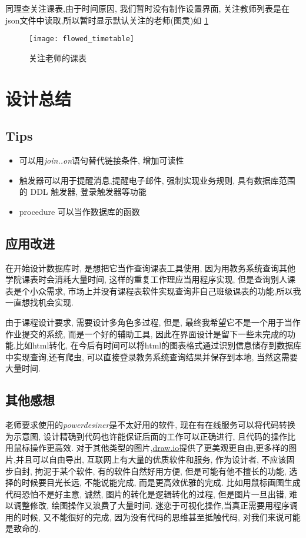 \documentclass{myreport}
\begin{document}
    同理查关注课表,由于时间原因,
    我们暂时没有制作设置界面, 关注教师列表是在json文件中读取,所以暂时显示默认关注的老师(图灵)如
    \cref{fig:flowed_timetable}
    \begin{figure}[H]
      \centering
      \texttt{[image: flowed\_timetable]}
      \caption{关注老师的课表}
      \label{fig:flowed_timetable}
    \end{figure}


\section{设计总结}
  \subsection{Tips}
    \begin{itemize}
      \item 可以用\emph{join..on}语句替代链接条件, 增加可读性
      \item 触发器可以用于提醒消息,提醒电子邮件,
        强制实现业务规则,
        具有数据库范围的 DDL 触发器,
        登录触发器等功能
      \item procedure 可以当作数据库的函数
    \end{itemize}
  \subsection{应用改进}
    在开始设计数据库时, 是想把它当作查询课表工具使用,
    因为用教务系统查询其他学院课表时会消耗大量时间,
    这样的重复工作理应当用程序实现,
    但是查询别人课表是个小众需求, 市场上并没有课程表软件实现查询非自己班级课表的功能,所以我一直想找机会实现.

    由于课程设计要求, 需要设计多角色多过程,
    但是, 最终我希望它不是一个用于当作作业提交的系统,
    而是一个好的辅助工具, 因此在界面设计是留下一些未完成的功能,比如html转化, 在今后有时间可以将html的图表格式通过识别信息储存到数据库中实现查询,还有爬虫, 可以直接登录教务系统查询结果并保存到本地, 当然这需要大量时间.
  \subsection{其他感想}

    老师要求使用的\emph{powerdesiner}是不太好用的软件,
    现在有在线服务可以将代码转换为示意图,
    设计精确到代码也许能保证后面的工作可以正确进行,
    且代码的操作比用鼠标操作更高效.
    对于其他类型的图片,\url{draw.io}提供了更美观更自由,更多样的图片,并且可以自由导出,
    互联网上有大量的优质软件和服务,
    作为设计者, 不应该固步自封, 拘泥于某个软件,
    有的软件自然好用方便, 但是可能有他不擅长的功能,
    选择的时候要目光长远, 不能说能完成,
    而是更高效优雅的完成.
    比如用鼠标画图生成代码恐怕不是好主意,
    诚然, 图片的转化是逻辑转化的过程,
    但是图片一旦出错, 难以调整修改,
    绘图操作又浪费了大量时间.
    迷恋于可视化操作,当真正需要用程序调用的时候,
    又不能很好的完成,
    因为没有代码的思维甚至抵触代码,
    对我们来说可能是致命的.
\end{document}
